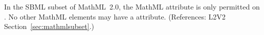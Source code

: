 In the SBML subset of MathML~2.0, the MathML attribute
 is only permitted on .  No other
MathML elements may have a  attribute.  (References:
L2V2 Section~\ref{sec:mathmlsubset}.)
